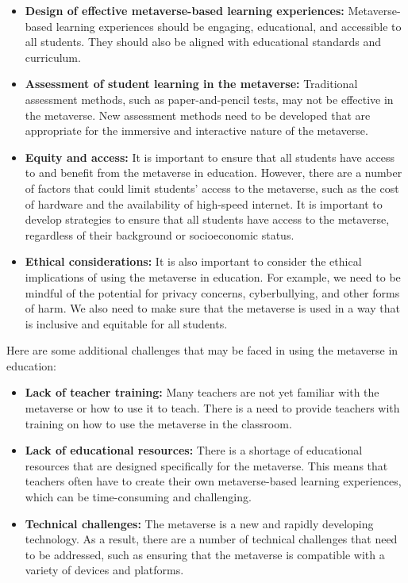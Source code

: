 \documentclass[12pt]{extarticle}
\begin{document}
\begin{itemize}
    \item \textbf{Design of effective metaverse-based learning experiences:} Metaverse-based learning experiences should be engaging, educational, and accessible to all students. They should also be aligned with educational standards and curriculum.
    \item \textbf{Assessment of student learning in the metaverse:} Traditional assessment methods, such as paper-and-pencil tests, may not be effective in the metaverse. New assessment methods need to be developed that are appropriate for the immersive and interactive nature of the metaverse.
    \item \textbf{Equity and access:} It is important to ensure that all students have access to and benefit from the metaverse in education. However, there are a number of factors that could limit students' access to the metaverse, such as the cost of hardware and the availability of high-speed internet. It is important to develop strategies to ensure that all students have access to the metaverse, regardless of their background or socioeconomic status.
    \item \textbf{Ethical considerations:} It is also important to consider the ethical implications of using the metaverse in education. For example, we need to be mindful of the potential for privacy concerns, cyberbullying, and other forms of harm. We also need to make sure that the metaverse is used in a way that is inclusive and equitable for all students.
\end{itemize}

Here are some additional challenges that may be faced in using the metaverse in education:

\begin{itemize}
    \item \textbf{Lack of teacher training:} Many teachers are not yet familiar with the metaverse or how to use it to teach. There is a need to provide teachers with training on how to use the metaverse in the classroom.
    \item \textbf{Lack of educational resources:} There is a shortage of educational resources that are designed specifically for the metaverse. This means that teachers often have to create their own metaverse-based learning experiences, which can be time-consuming and challenging.
    \item \textbf{Technical challenges:} The metaverse is a new and rapidly developing technology. As a result, there are a number of technical challenges that need to be addressed, such as ensuring that the metaverse is compatible with a variety of devices and platforms.
\end{itemize}
\end{document}
